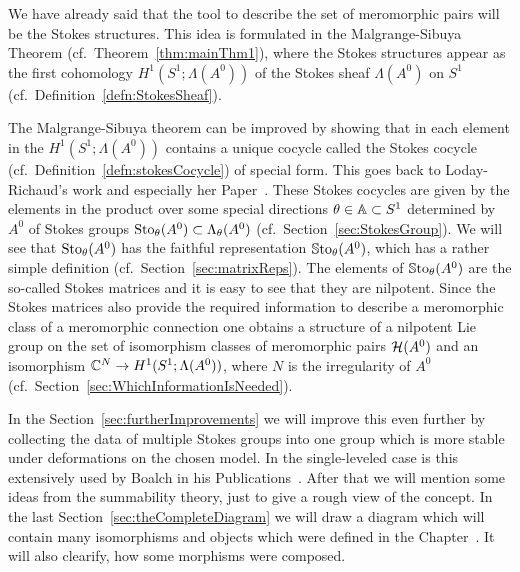We have already said that the tool to describe the set of meromorphic pairs will
be the Stokes structures.
This idea is formulated in the Malgrange-Sibuya Theorem
(cf.\ Theorem~\ref{thm:mainThm1}), where the Stokes structures appear as the
first cohomology $H^1(S^1;\Lambda(A^0))$ of the Stokes sheaf
$\Lambda(A^0)$ on $S^1$ (cf.\ Definition~\ref{defn:StokesSheaf}).

The Malgrange-Sibuya theorem can be improved by showing that in each element
in the $H^1(S^1;\Lambda(A^0))$ contains a unique cocycle called the Stokes
cocycle (cf.\ Definition~\ref{defn:stokesCocycle}) of special form.
This goes back to Loday-Richaud's work and especially her
Paper~\cite{Loday1994}.
These Stokes cocycles are given by the elements in the product over some
special directions $\theta\in\mathbb{A}\subset S^1$ determined by $A^0$ of Stokes groups
$\operatorname{Sto}_\theta(A^0)\subset\Lambda_\theta(A^0)$ (cf.\ Section~\ref{sec:StokesGroup}).
We will see that $\operatorname{Sto}_\theta(A^0)$ has the faithful representation
$\operatorname{\mathbb{S}to}_\theta(A^0)$, which has a rather simple definition
(cf.\ Section~\ref{sec:matrixReps}).
The elements of $\operatorname{\mathbb{S}to}_\theta(A^0)$ are the so-called Stokes matrices and it is
easy to see that they are nilpotent.
Since the Stokes matrices also provide the required information to describe a
meromorphic class of a meromorphic connection one obtains a structure of a
nilpotent Lie group on the set of isomorphism classes of meromorphic pairs
$\mathcal{H}(A^0)$ and an isomorphism $\mathbb{C}^N\to H^1(S^1;\Lambda(A^0))$, where $N$ is the
irregularity of $A^0$ (cf.\ Section~\ref{sec:WhichInformationIsNeeded}).

In the Section~\ref{sec:furtherImprovements} we will improve this even further
by collecting the data of multiple Stokes groups into one group which is more
stable under deformations on the chosen model. In the single-leveled case is
this extensively used by Boalch in his Publications~\cite{boalch,thboalch}.
After that we will mention some ideas from the summability theory, just to give
a rough view of the concept.
In the last Section~\ref{sec:theCompleteDiagram} we will draw a diagram which
will contain many isomorphisms and objects which were defined in the
Chapter~\label{chap:stokes}. It will also clearify, how some morphisms were
composed.

